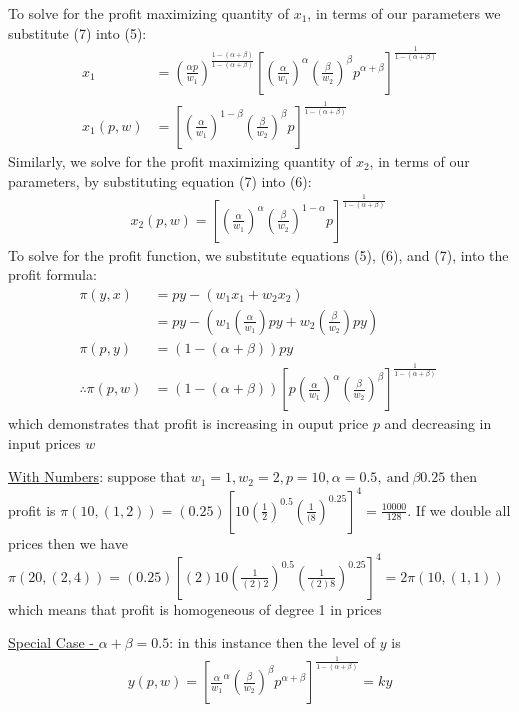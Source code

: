 \documentclass{article}
\begin{document}
To solve for the profit maximizing quantity of $x_{1}$, in terms of our parameters we substitute (7) into (5):
\begin{align*}
  x_{1} &= (\frac{\alpha p}{w_{1}})^{\tfrac{1-(\alpha + \beta)}{1-(\alpha + \beta)}} [(\frac{\alpha}{w_{1}})^{\alpha}(\frac{\beta}{w_{2}})^{\beta}p^{\alpha+\beta}]^{\tfrac{1}{1 - (\alpha + \beta)}} \\
  x_{1}(p,w) &= [(\frac{\alpha}{w_{1}})^{1 - \beta} (\frac{\beta}{w_{2}})^{\beta}p]^{\tfrac{1}{1 - (\alpha + \beta)}} \ \tag{*}
\end{align*}
Similarly, we solve for the profit maximizing quantity of $x_{2}$, in terms of our parameters, by substituting equation (7) into (6):
\begin{gather*}
  x_{2}(p,w) = [(\frac{\alpha}{w_{1}})^{\alpha}(\frac{\beta}{w_{2}})^{1- \alpha}p]^{\tfrac{1}{1 - (\alpha + \beta)}} \ \tag{**}
\end{gather*}
To solve for the profit function, we substitute equations (5), (6), and (7), into the profit formula:
\begin{align*}
  \pi(y,x) &= py - (w_{1}x_{1} + w_{2}x_{2}) \\
  &= py - (w_{1}(\frac{\alpha}{w_{1}})py + w_{2}(\frac{\beta}{w_{2}})py) \\
  \pi (p,y) &= (1 - (\alpha + \beta))py \\
  \therefore \pi (p,w) &= (1- (\alpha + \beta))[p(\frac{\alpha}{w_{1}})^{\alpha}(\frac{\beta}{w_{2}})^{\beta}]^{\tfrac{1}{1 - (\alpha + \beta)}} \ \tag{$\star$}
\end{align*}
which demonstrates that profit is increasing in ouput price $p$ and decreasing in input prices $w$
\par \vspace{0.3em}
  \underline{With Numbers}: suppose that $w_{1} = 1, w_{2} = 2, p = 10, \alpha = 0.5, \ \text{and} \ \beta 0.25$ then profit is $\pi(10,(1,2)) = (0.25)[10(\tfrac{1}{2})^{0.5}(\tfrac{1}{(8})^{0.25}]^{4} = \tfrac{10000}{128}$. If we double all prices then we have $\pi(20, (2,4)) = (0.25)[(2)10(\tfrac{1}{(2)2})^{0.5}(\tfrac{1}{(2)8})^{0.25}]^{4} = 2\pi(10,(1,1))$ which means that profit is homogeneous of degree 1 in prices
  \par
  \underline{Special Case - $\alpha + \beta = 0.5$}: in this instance then the level of $y$ is
  \begin{gather*}
    y(p,w) = [\frac{\alpha}{w_{1}}^{\alpha}(\frac{\beta}{w_{2}})^{\beta}p^{\alpha + \beta}]^{\frac{1}{1 - (\alpha + \beta)}} = ky
  \end{gather*}
\end{document}
